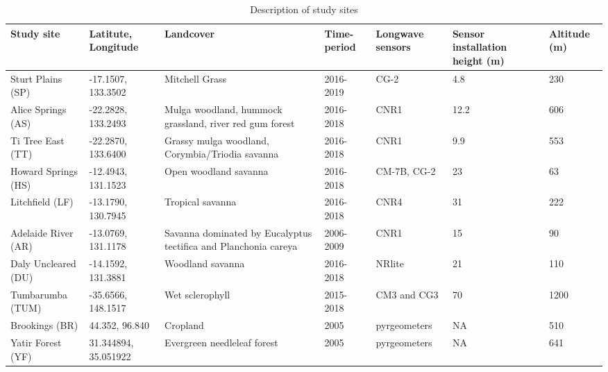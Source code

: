 \documentclass[fleqn,10pt]{wlscirep}
\begin{document}
\begin{table}[h!]
\centering
\caption{Description of study sites}
\begin{tabular}{|p{2.5cm}|p{1.5cm}|p{2.2cm}|p{1.5cm}|p{2cm}|p{1cm}|p{1cm}|}
 \hline
 \textbf{Study site} &\textbf{Latitute, Longitude} & \textbf{Landcover} & \textbf{Time-period} 
 & \textbf{Longwave sensors} & \textbf{Sensor installation height (m)} & \textbf{Altitude (m)} \\
 \hline 
 Sturt Plains (SP) &  -17.1507, 133.3502 & Mitchell Grass & 2016-2019 & CG-2 & 4.8 & 230\\ 
 \hline
 Alice Springs (AS) &  -22.2828, 133.2493 &  Mulga woodland, hummock grassland, river red gum forest & 2016-2018 & CNR1 & 12.2 & 606\\ 
 \hline 
 Ti Tree East (TT) &  -22.2870, 133.6400 & Grassy mulga woodland, Corymbia/Triodia savanna & 2016-2018 & CNR1 & 9.9 & 553  \\
 \hline
 Howard Springs (HS) &  -12.4943, 131.1523 & Open woodland savanna & 2016-2018 & CM-7B, CG-2 & 23 & 63\\
 \hline
 Litchfield (LF) &  -13.1790, 130.7945 & Tropical savanna & 2016-2018 & CNR4 & 31 & 222 \\
 \hline
 Adelaide River (AR) & -13.0769, 131.1178 & Savanna dominated by Eucalyptus tectifica and Planchonia careya & 2006-2009 & CNR1 & 15 & 90\\
 \hline
Daly Uncleared (DU) & -14.1592, 131.3881 & Woodland savanna & 2016-2018 & NRlite & 21 & 110 \\
 \hline
 Tumbarumba (TUM) & -35.6566, 148.1517 & Wet sclerophyll & 2015-2018 &CM3 and CG3 & 70 & 1200 \\
 \hline
Brookings (BR) & 44.352, 96.840 & Cropland & 2005 & pyrgeometers\cite{guillevic2017land}& NA & 510\cite{wang2008validating}
 \\
 \hline 
 Yatir Forest (YF) & 31.344894, 35.051922 & Evergreen needleleaf forest & 2005 & pyrgeometers\cite{guillevic2017land}
 & NA & 641\\
 \hline 
\end{tabular}
\label{table:studysites}
\end{table}
\end{document}
